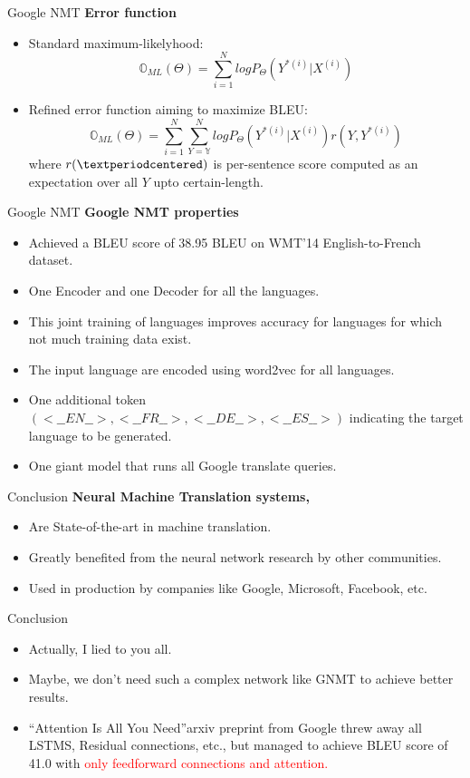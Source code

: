 ﻿\documentclass[table,aspectratio=43,mathserif,xcolor={usenames,dvipsnames,svgnames,table},10pt]{beamer}
\begin{document}
\begin{frame}{Google NMT}
 \textbf{Error function}
 \begin{itemize}
 \item<+-> Standard maximum-likelyhood:
 $$\mathbb{O}_{ML}(\Theta) = \sum_{i=1}^N log P_\Theta(Y^{*(i)} | X^{(i)}) $$
 \item<+-> Refined error function aiming to maximize BLEU:
 $$ \mathbb{O}_{ML}(\Theta) = \sum_{i=1}^N \sum_{Y=\mathbb{Y}}^N log P_\Theta(Y^{*(i)} | X^{(i)}) r(Y, Y^{*(i)} ) $$
 where $r(\textperiodcentered)$ is per-sentence score computed as an expectation over all $Y$ upto certain-length.
 \end{itemize}
\end{frame}


\begin{frame}{Google NMT}
\textbf{Google NMT properties}
\begin{itemize}
 \item<+-> Achieved a BLEU score of 38.95 BLEU on WMT’14 English-to-French dataset. 
 \item<+-> One Encoder and one Decoder for all the languages.
 \item<+-> This joint training of languages improves accuracy for languages for which not much training data exist.
 \item<+-> The input language are encoded using word2vec for all languages.
 \item<+-> One additional token $(<\_\_EN\_\_>, <\_\_FR\_\_>, <\_\_DE\_\_>, <\_\_ES\_\_>)$ indicating the target language to be generated.
 \item<+-> One giant model that runs all Google translate queries.
\end{itemize}
\end{frame}

\begin{frame}{Conclusion}
\textbf{Neural Machine Translation systems,}
\begin{itemize} 
 \item Are State-of-the-art in machine translation.
 \item Greatly benefited from the neural network research by other communities.
 \item Used in production by companies like Google, Microsoft, Facebook, etc.
\end{itemize}
\end{frame}

\begin{frame}{Conclusion}
 \begin{itemize}
  \item<+-> Actually, I lied to you all.
  \item<+-> Maybe, we don't need such a complex network like GNMT to achieve better results.
  \item<+-> \textquotedblleft Attention Is All You Need\textquotedblright arxiv preprint from Google threw away all LSTMS, Residual connections, etc., but managed to achieve BLEU score of 41.0 with  \textcolor{red} {only feedforward connections and attention.}
 \end{itemize}

\end{frame}
\end{document}
